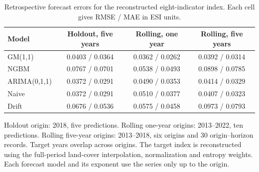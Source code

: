 \documentclass[preprint,11pt,authoryear]{elsarticle}
\begin{document}
\begin{table}[htbp]
\centering
\caption{Retrospective forecast errors for the reconstructed eight-indicator index. Each cell gives RMSE / MAE in ESI units.}
\label{tab:validation}
\footnotesize
\setlength{\tabcolsep}{3pt}
\begin{tabular}{lccc}
\toprule
Model & Holdout, five years & Rolling, one year & Rolling, five years \\
\midrule
GM(1,1) & 0.0403 / 0.0364 & 0.0362 / 0.0262 & 0.0392 / 0.0314 \\
NGBM & 0.0767 / 0.0701 & 0.0538 / 0.0493 & 0.0898 / 0.0785 \\
ARIMA(0,1,1) & 0.0372 / 0.0291 & 0.0490 / 0.0353 & 0.0414 / 0.0329 \\
Naive & 0.0372 / 0.0291 & 0.0510 / 0.0377 & 0.0407 / 0.0323 \\
Drift & 0.0676 / 0.0536 & 0.0575 / 0.0458 & 0.0973 / 0.0793 \\
\bottomrule
\end{tabular}

\vspace{2pt}
{\scriptsize Holdout origin: 2018, five predictions. Rolling one-year origins: 2013--2022, ten predictions. Rolling five-year origins: 2013--2018, six origins and 30 origin--horizon records. Target years overlap across origins. The target index is reconstructed using the full-period land-cover interpolation, normalization and entropy weights. Each forecast model and its exponent use the series only up to the origin.}
\end{table}
\end{document}
